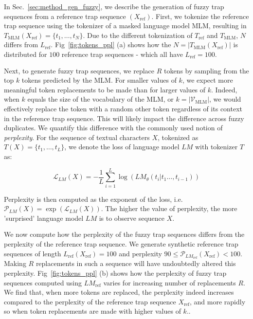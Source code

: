 In Sec.~\ref{sec:method_gen_fuzzy}, we describe the generation of fuzzy trap sequences from a reference trap sequence $(X_{\text{ref}})$. First, we tokenize the reference trap sequence using the tokenizer of a masked language model MLM, resulting in $T_{\text{MLM}}(X_{\text{ref}}) = \{t_1,\ldots,t_N\}$. Due to the different tokenization of $T_{\text{ref}}$ and $T_{\text{MLM}}$, $N$ differs from $L_{\text{ref}}$. Fig~\ref{fig:tokens_ppl} (a) shows how the $N=|T_{\text{MLM}}(X_{\text{ref}})|$ is distributed for $100$ reference trap sequences - which all have $L_{\text{ref}}=100$. 

Next, to generate fuzzy trap sequences, we replace $R$ tokens by sampling from the top $k$ tokens predicted by the MLM. For smaller values of $k$, we expect more meaningful token replacements to be made than for larger values of $k$. Indeed, when $k$ equals the size of the vocabulary of the MLM, or $k=|\mathcal{V}_{\text{MLM}}|$, we would effectively replace the token with a random other token regardless of its context in the reference trap sequence. This will likely impact the difference across fuzzy duplicates. We quantify this difference with the commonly used notion of \emph{perplexity}. For the sequence of textual characters $X$, tokenized as $T(X) = \{t_1,\ldots,t_L\}$, we denote the loss of language model $\textit{LM}$ with tokenizer $T$ as:

\begin{equation}
\label{eq:loss}
\mathcal{L}_{\textit{LM}}(X) = -\frac{1}{L}\sum_{i=1}^{L} \log\left( \textit{LM}_{\theta}(t_i | t_1 \ldots, t_{i-1})\right) 
\end{equation}

Perplexity is then computed as the exponent of the loss, i.e. $\mathcal{P}_{\textit{LM}}(X) = \exp\left(\mathcal{L}_{\textit{LM}}(X)\right)$. The higher the value of perplexity, the more 'surprised' language model $\textit{LM}$ is to observe sequence $X$. 

We now compute how the perplexity of the fuzzy trap sequences differs from the perplexity of the reference trap sequence. We generate synthetic reference trap sequences of length $L_{\text{ref}}(X_{\text{ref}})=100$ and perplexity $90 \leq \mathcal{P}_{\textit{LM}_{\text{ref}}}(X_{\text{ref}}) < 100$. Making $R$ replacements in such a sequence will have undoubtedly altered this perplexity. Fig~\ref{fig:tokens_ppl} (b) shows how the perplexity of fuzzy trap sequences computed using $\textit{LM}_{\text{ref}}$ varies for increasing number of replacements $R$. We find that, when more tokens are replaced, the perplexity indeed increases compared to the perplexity of the reference trap sequence $X_{\text{ref}}$, and more rapidly so when token replacements are made with higher values of $k$..  

